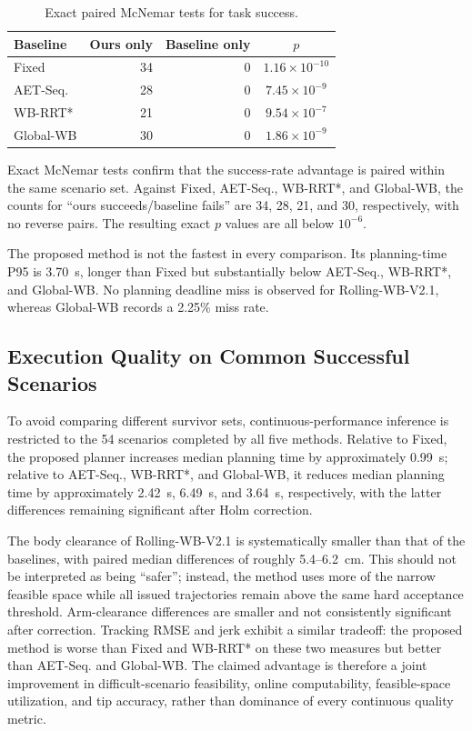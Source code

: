 \documentclass[journal,twoside]{IEEEtran}
\begin{document}
\begin{table}[t]
\centering
\caption{Exact paired McNemar tests for task success.}
\label{tab:mcnemar}
\begin{tabular}{lrrc}
\toprule
Baseline & Ours only & Baseline only & $p$ \\
\midrule
Fixed & 34 & 0 & $1.16\times10^{-10}$ \\
AET-Seq. & 28 & 0 & $7.45\times10^{-9}$ \\
WB-RRT* & 21 & 0 & $9.54\times10^{-7}$ \\
Global-WB & 30 & 0 & $1.86\times10^{-9}$ \\
\bottomrule
\end{tabular}
\end{table}
Exact McNemar tests confirm that the success-rate advantage is paired within the same scenario set. Against Fixed, AET-Seq., WB-RRT*, and Global-WB, the counts for ``ours succeeds/baseline fails'' are 34, 28, 21, and 30, respectively, with no reverse pairs. The resulting exact $p$ values are all below $10^{-6}$.

The proposed method is not the fastest in every comparison. Its planning-time P95 is 3.70~s, longer than Fixed but substantially below AET-Seq., WB-RRT*, and Global-WB. No planning deadline miss is observed for Rolling-WB-V2.1, whereas Global-WB records a 2.25\% miss rate.

\subsection{Execution Quality on Common Successful Scenarios}
To avoid comparing different survivor sets, continuous-performance inference is restricted to the 54 scenarios completed by all five methods. Relative to Fixed, the proposed planner increases median planning time by approximately 0.99~s; relative to AET-Seq., WB-RRT*, and Global-WB, it reduces median planning time by approximately 2.42~s, 6.49~s, and 3.64~s, respectively, with the latter differences remaining significant after Holm correction.

The body clearance of Rolling-WB-V2.1 is systematically smaller than that of the baselines, with paired median differences of roughly 5.4--6.2~cm. This should not be interpreted as being ``safer''; instead, the method uses more of the narrow feasible space while all issued trajectories remain above the same hard acceptance threshold. Arm-clearance differences are smaller and not consistently significant after correction. Tracking RMSE and jerk exhibit a similar tradeoff: the proposed method is worse than Fixed and WB-RRT* on these two measures but better than AET-Seq. and Global-WB. The claimed advantage is therefore a joint improvement in difficult-scenario feasibility, online computability, feasible-space utilization, and tip accuracy, rather than dominance of every continuous quality metric.
\end{document}
